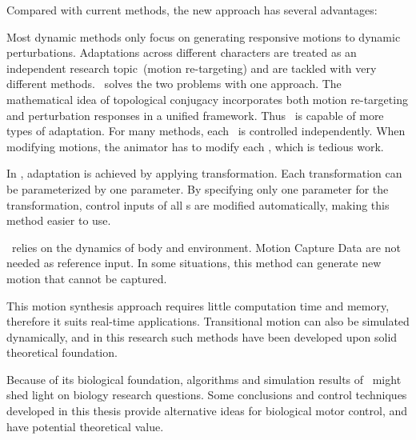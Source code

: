 Compared with current \cms methods, the new approach has several advantages:
\begin{enumerate}
Most dynamic methods only focus on generating responsive motions to dynamic perturbations.
Adaptations across different characters are treated as an independent research topic~(motion re-targeting) and are tackled with very different methods.
{\moit}\ solves the two problems with one approach.
The mathematical idea of topological conjugacy  incorporates both motion re-targeting and  perturbation responses  in a unified framework.
Thus {\moit}\ is capable of more types of adaptation.
For many \cms methods, each \dof ~is controlled independently.
When modifying motions, the animator has to modify each \dof, which is tedious work.

In {\moit}, adaptation is achieved by applying transformation.
Each transformation can be parameterized by one parameter. 
By specifying only one parameter for the transformation, control inputs of all {\dof}s are modified automatically, making this method easier to use.

{\moit}\ relies on the dynamics of body and environment.
Motion Capture Data are not needed as reference input.
In some situations, this method can generate new motion that cannot be captured.


This motion synthesis approach requires little computation time and memory, therefore it suits real-time applications.
Transitional motion can also be simulated dynamically, and in this research such methods have been developed upon solid theoretical foundation.

\end{enumerate}

Because of its biological foundation,
algorithms and simulation results of {\moit}\  might shed light on biology research questions.
Some conclusions and control techniques developed in this thesis provide alternative ideas for biological motor control, and have potential theoretical value.


